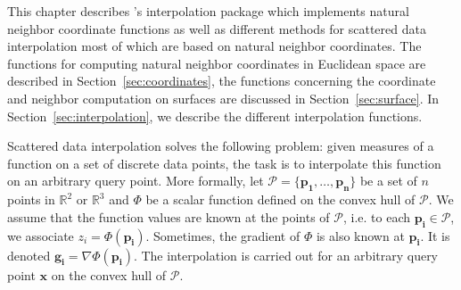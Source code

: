 This chapter describes \cgal's interpolation package which implements
natural neighbor coordinate functions as well as different
methods for scattered data interpolation most of which are based on
natural neighbor coordinates. The functions for computing natural neighbor 
coordinates in Euclidean space are described in 
Section~\ref{sec:coordinates}, 
the functions concerning the coordinate and neighbor 
computation on surfaces are discussed in Section~\ref{sec:surface}. 
In Section~\ref{sec:interpolation}, we describe the different interpolation 
functions.   

Scattered data interpolation solves the following problem: given
measures of a function on a set of discrete data points, the task is
to interpolate this function on an arbitrary query point.
More formally, let $\mathcal{P}=\{\mathbf{p_1},\ldots ,\mathbf{p_n}\}$ be a set of
$n$ points in $\mathbb{R}^2$ or $\mathbb{R}^3$ and $\Phi$ be a scalar
function defined on the convex hull of $\mathcal{P}$. We assume that
the function values are known at the points of $\mathcal{P}$, i.e. to
each $\mathbf{p_i} \in \mathcal{P}$, we associate $z_i =
\Phi(\mathbf{p_i})$. Sometimes, the gradient of $\Phi$ is also known
at $\mathbf{p_i}$. It is denoted $\mathbf{g_i}= \nabla
\Phi(\mathbf{p_i})$. The interpolation is carried out for an arbitrary query point
$\mathbf{x}$ on the convex hull of $\mathcal{P}$.

